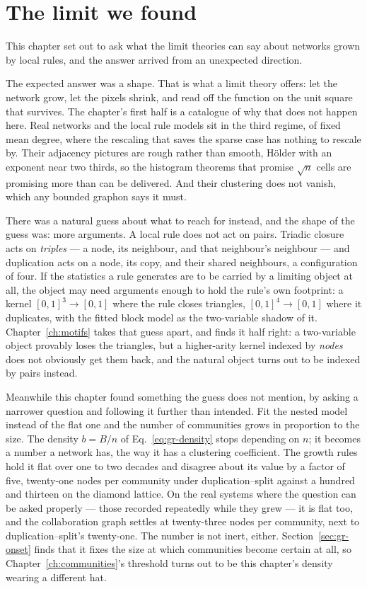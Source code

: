 \section{The limit we found}
\label{sec:gr-conclusion}

This chapter set out to ask what the limit theories can say about networks grown
by local rules, and the answer arrived from an unexpected direction.

The expected answer was a shape. That is what a limit theory offers: let the
network grow, let the pixels shrink, and read off the function on the unit square
that survives. The chapter's first half is a catalogue of why that does not
happen here. Real networks and the local rule models sit in the third regime, of fixed
mean degree, where the rescaling that saves the sparse case has nothing to
rescale by. Their adjacency pictures are rough rather than smooth, H\"older with
an exponent near two thirds, so the histogram theorems that promise $\sqrt n$
cells are promising more than can be delivered. And their clustering does not
vanish, which any bounded graphon says it must.

There was a natural guess about what to reach for instead, and the shape of the
guess was: more arguments. A local rule does not act on pairs. Triadic closure
acts on \emph{triples} --- a node, its neighbour, and that neighbour's neighbour
--- and duplication acts on a node, its copy, and their shared neighbours, a
configuration of four. If the statistics a rule generates are to be carried by a
limiting object at all, the object may need arguments enough to hold the rule's
own footprint: a kernel $[0,1]^3\to[0,1]$ where the rule closes triangles,
$[0,1]^4\to[0,1]$ where it duplicates, with the fitted block model as the
two-variable shadow of it. Chapter~\ref{ch:motifs} takes that guess apart, and
finds it half right: a two-variable object provably loses the triangles, but a
higher-arity kernel indexed by \emph{nodes} does not obviously get them back, and
the natural object turns out to be indexed by pairs instead.

Meanwhile this chapter found something the guess does not mention, by asking a
narrower question and following it further than intended. Fit the nested model
instead of the flat one and the number of communities grows in proportion to the
size. The density $b=B/n$ of Eq.~\eqref{eq:gr-density} stops depending on $n$; it
becomes a number a network has, the way it has a clustering coefficient. The growth rules hold it flat over one to
two decades and disagree about its value by a factor of five, twenty-one nodes
per community under duplication--split against a hundred and thirteen on the
diamond lattice. On
the real systems where the question can be asked properly --- those recorded
repeatedly while they grew --- it is flat too, and the collaboration graph settles
at twenty-three nodes per community, next to duplication--split's twenty-one.
The number is not inert, either. Section~\ref{sec:gr-onset} finds that it fixes
the size at which communities become certain at all, so
Chapter~\ref{ch:communities}'s threshold turns out to be this chapter's density
wearing a different hat.


